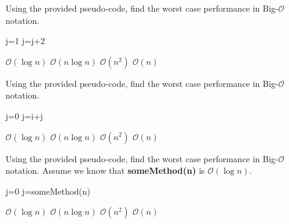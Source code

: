 \documentclass{exam}
\begin{document}
\begin{questions}
\question Using the provided pseudo-code, find the worst case performance in Big-$\mathcal{O}$ notation.
        \begin{algorithm}[H]
        \caption{Some messy pseudo-code}\label{algor1}
            \begin{algorithmic}[1]
                        \State j=1
                            \State j=j+2
                        \EndWhile
                    \EndFor
                \EndProcedure
            \end{algorithmic}
        \end{algorithm}
    \begin{choices}
        \choice $\mathcal{O}(\log n)$
        \choice $\mathcal{O}(n\log n)$
        \CorrectChoice $\mathcal{O}(n^{2})$
        \choice $\mathcal{O}(n)$
    \end{choices}

\question Using the provided pseudo-code, find the worst case performance in Big-$\mathcal{O}$ notation.
        \begin{algorithm}[H]
        \caption{Some more messy pseudocode}\label{algor2}
            \begin{algorithmic}[1]
                    \State j=0
                        \State j=i+j
                    \EndFor
                \EndProcedure
            \end{algorithmic}
        \end{algorithm}
    \begin{choices}
        \choice $\mathcal{O}(\log n)$
        \choice $\mathcal{O}(n\log n)$
        \choice $\mathcal{O}(n^{2})$
        \CorrectChoice $\mathcal{O}(n)$
    \end{choices}


\question Using the provided pseudo-code, find the worst case performance in Big-$\mathcal{O}$ notation. Assume we know that \textbf{someMethod(n)} is $\mathcal{O}(\log n)$.
        \begin{algorithm}[H]
        \caption{Some pseudocode with a method in it}\label{algor3}
            \begin{algorithmic}[1] %
                    \State j=0
                        \State j=someMethod(n)
                    \EndFor
                \EndProcedure
            \end{algorithmic}
        \end{algorithm}
    \begin{choices}
        \choice $\mathcal{O}(\log n)$
        \CorrectChoice $\mathcal{O}(n\log n)$
        \choice $\mathcal{O}(n^{2})$
        \choice $\mathcal{O}(n)$
    \end{choices}



\end{questions}
\end{document}
